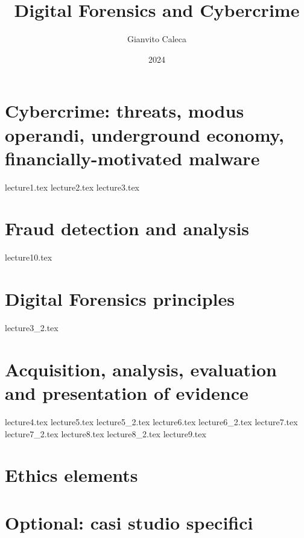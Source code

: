 \documentclass{report}
\title{Digital Forensics and Cybercrime}
\date{2024}
\author{Gianvito Caleca}
\begin{document}
\maketitle
\tableofcontents
\part{Cybercrime: threats, modus operandi, underground economy, financially-motivated malware}
{lecture1.tex}
{lecture2.tex}
{lecture3.tex}
\part{Fraud detection and analysis}
{lecture10.tex}
\part{Digital Forensics principles}
{lecture3_2.tex}
\part{Acquisition, analysis, evaluation and presentation of evidence}
{lecture4.tex}
{lecture5.tex}
{lecture5_2.tex}
{lecture6.tex}
{lecture6_2.tex}
{lecture7.tex}
{lecture7_2.tex}
{lecture8.tex}
{lecture8_2.tex}
{lecture9.tex}
\part{Ethics elements}
\part{Optional: casi studio specifici}
\end{document}
